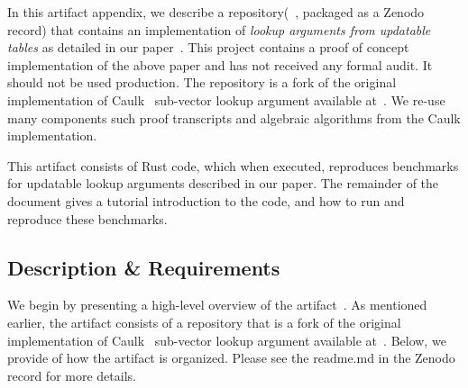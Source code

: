 \documentclass[sigconf]{acmart}
\begin{document}
	In this artifact appendix, we describe a repository(~\cite{}, packaged as a Zenodo record) that contains an implementation of \textit{lookup arguments from updatable tables} as detailed in our paper~\cite{full-ver}. This project contains a proof of concept implementation of the above paper and has not received any formal audit. It should not be used production. The repository is a fork of the original implementation of Caulk~\cite{} sub-vector lookup argument available at~\cite{}. We re-use many components such proof transcripts and algebraic algorithms from the Caulk implementation. 
	
	This artifact consists of Rust code, which when executed, reproduces benchmarks for updatable lookup arguments described in our paper. The remainder of the document gives a tutorial introduction to the code, and how to run and reproduce these benchmarks.
	
	
	\subsection{Description \& Requirements}
	

	We begin by presenting a high-level overview of the artifact~\cite{}. As mentioned earlier, the artifact consists of a repository that is a fork of the original implementation of Caulk~\cite{} sub-vector lookup argument available at~\cite{}. Below, we provide of how the artifact is organized. Please see the readme.md in the Zenodo record for more details.
	
\end{document}
